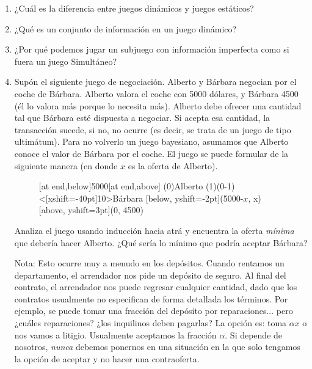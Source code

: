 \documentclass[12pt]{article}
\begin{document}
\begin{enumerate}
	\setlength{\itemsep}{0pt}
	\setlength{\parskip}{0pt}
	\setlength{\parsep}{0pt}
	\item ¿Cuál es la diferencia entre juegos dinámicos y juegos estáticos?
	\item ¿Qué es un conjunto de información en un juego dinámico?
	\item ¿Por qué podemos jugar un subjuego con información imperfecta como si fuera un juego Simultáneo?
	\item Supón el siguiente juego de negociación. Alberto y Bárbara negocian por el coche de Bárbara. Alberto valora el coche con 5000 dólares, y Bárbara 4500 (él lo valora más porque lo necesita más). Alberto debe ofrecer una cantidad tal que Bárbara esté dispuesta a negociar. Si acepta esa cantidad, la transacción sucede, si no, no ocurre (es decir, se trata de un juego de tipo ultimátum). Para no volverlo un juego bayesiano, asumamos que Alberto conoce el valor de Bárbara por el coche. El juego se puede formular de la siguiente manera (en donde $ x $ es la oferta de Alberto).

	      \begin{figure}[H]
		      \centering
		      \begin{istgame}[font=\scriptsize]
			      \cntmdistance{20mm}{20mm}
			      [at end,below]{5000}[at end,above]
			      \istrootcntmA(0){Alberto}
			      \istbA[draw=none]
			      \endist
			      \istroot(1)(0-1)<[xshift=-40pt]10>{Bárbara}
			      [below, yshift=-2pt]{(5000-$x$, x)} [above, yshift=3pt]{(0, 4500)}
			      \endist
		      \end{istgame}
	      \end{figure}

	      Analiza el juego usando inducción hacia atrá y encuentra la oferta \textit{mínima} que debería hacer Alberto. ¿Qué sería lo mínimo que podría aceptar Bárbara?

	      Nota: Esto ocurre muy a menudo en los depósitos. Cuando rentamos un departamento, el arrendador nos pide un depósito de seguro. Al final del contrato, el arrendador nos puede regresar cualquier cantidad, dado que los contratos usualmente no especifican de forma detallada los términos. Por ejemplo, se puede tomar una fracción del depósito por reparaciones... pero ¿cuáles reparaciones? ¿los inquilinos deben pagarlas? La opción es: toma $\alpha x$ o nos vamos a litigio. Usualmente aceptamos la fracción $ \alpha $. Si depende de nosotros, \textit{nunca} debemos ponernos en una situación en la que solo tengamos la opción de aceptar y no hacer una contraoferta.

\end{enumerate}
\end{document}
